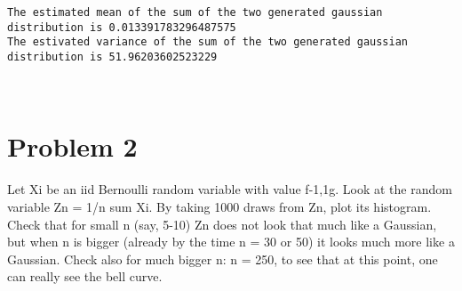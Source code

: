 \documentclass[11pt]{article}
\begin{document}
    \begin{Verbatim}[commandchars=\\\{\}]
The estimated mean of the sum of the two generated gaussian distribution is 0.013391783296487575
The estivated variance of the sum of the two generated gaussian distribution is 51.96203602523229

    \end{Verbatim}

    \begin{center}
    \end{center}
    { \hspace*{\fill} \\}
    
    \section{Problem 2}\label{problem-2}

Let Xi be an iid Bernoulli random variable with value f-1,1g. Look at
the random variable Zn = 1/n sum Xi. By taking 1000 draws from Zn, plot
its histogram. Check that for small n (say, 5-10) Zn does not look that
much like a Gaussian, but when n is bigger (already by the time n = 30
or 50) it looks much more like a Gaussian. Check also for much bigger n:
n = 250, to see that at this point, one can really see the bell curve.
\end{document}
